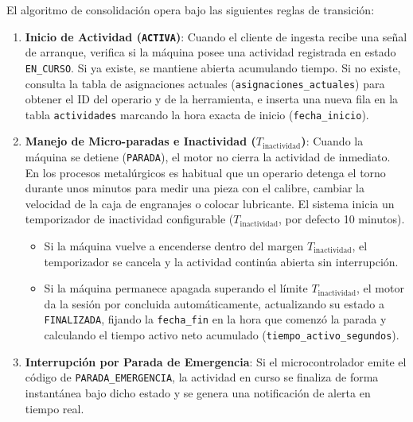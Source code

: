 \documentclass[11pt,a4paper]{article}
\begin{document}
El algoritmo de consolidación opera bajo las siguientes reglas de transición:
\begin{enumerate}
    \item \textbf{Inicio de Actividad (\texttt{ACTIVA})}: Cuando el cliente de ingesta recibe una señal de arranque, verifica si la máquina posee una actividad registrada en estado \texttt{EN\_CURSO}. Si ya existe, se mantiene abierta acumulando tiempo. Si no existe, consulta la tabla de asignaciones actuales (\texttt{asignaciones\_actuales}) para obtener el ID del operario y de la herramienta, e inserta una nueva fila en la tabla \texttt{actividades} marcando la hora exacta de inicio (\texttt{fecha\_inicio}).
    \item \textbf{Manejo de Micro-paradas e Inactividad ($T_{\text{inactividad}}$)}: Cuando la máquina se detiene (\texttt{PARADA}), el motor no cierra la actividad de inmediato. En los procesos metalúrgicos es habitual que un operario detenga el torno durante unos minutos para medir una pieza con el calibre, cambiar la velocidad de la caja de engranajes o colocar lubricante. El sistema inicia un temporizador de inactividad configurable ($T_{\text{inactividad}}$, por defecto 10 minutos).
    \begin{itemize}
        \item Si la máquina vuelve a encenderse dentro del margen $T_{\text{inactividad}}$, el temporizador se cancela y la actividad continúa abierta sin interrupción.
        \item Si la máquina permanece apagada superando el límite $T_{\text{inactividad}}$, el motor da la sesión por concluida automáticamente, actualizando su estado a \texttt{FINALIZADA}, fijando la \texttt{fecha\_fin} en la hora que comenzó la parada y calculando el tiempo activo neto acumulado (\texttt{tiempo\_activo\_segundos}).
    \end{itemize}
    \item \textbf{Interrupción por Parada de Emergencia}: Si el microcontrolador emite el código de \texttt{PARADA\_EMERGENCIA}, la actividad en curso se finaliza de forma instantánea bajo dicho estado y se genera una notificación de alerta en tiempo real.
\end{enumerate}
\end{document}
